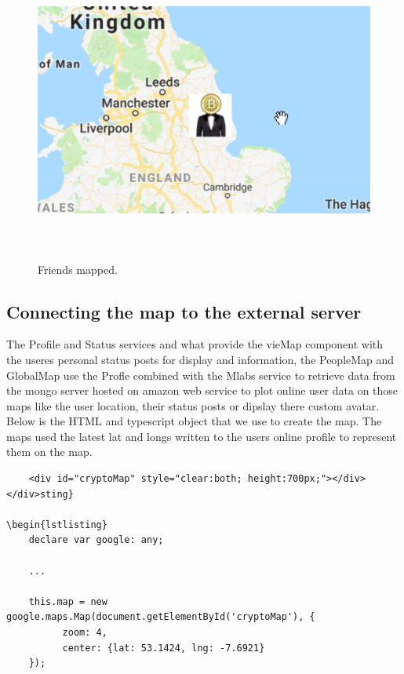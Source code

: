 \begin{figure}[H]
\centering
\includegraphics[width=16cm, height=10cm]{img/map3.png}
\caption{Friends mapped.}
\end{figure}

\subsection{Connecting the map to the external server}
 The Profile and Status services and what provide the vieMap component with the useres personal status posts for display and information, the PeopleMap and GlobalMap use the Profle combined with the Mlabs service to retrieve data from the mongo server hosted on amazon web service to plot online user data on those maps like the user location, their status posts or dipslay there custom avatar. Below is the HTML and typescript object that we use to create the map. The maps used the latest lat and longs written to the users online profile to represent them on the map.

\begin{lstlisting}
    <div id="cryptoMap" style="clear:both; height:700px;"></div>
</div>sting}

\begin{lstlisting}
    declare var google: any;

    ...
    
    this.map = new google.maps.Map(document.getElementById('cryptoMap'), {
          zoom: 4,
          center: {lat: 53.1424, lng: -7.6921}
    });
\end{lstlisting}

